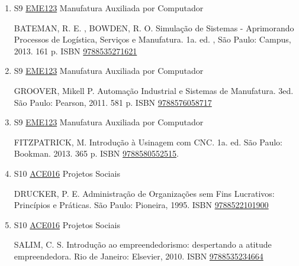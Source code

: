 \documentclass[12pt,a4paper]{book}
\begin{document}
\begin{enumerate}
 
 
 \item S9 \hyperref[PUD:EME123]{EME123} Manufatura Auxiliada por Computador

 BATEMAN, R. E. , BOWDEN, R. O.  Simulação de Sistemas - Aprimorando Processos de Logística, Serviços e Manufatura.  1a. ed. , São Paulo: Campus, 2013.  161 p.  ISBN \href{http://www.bn.br/site/pages/servicosProfissionais/agenciaISBN/isbnBusca/FbnBuscaISBNCatalogo.asp?pField=ISBN&pIntPagina=1&pISBN=35271621&nidbISBN=true&hidbISBN=true}{9788535271621}

 
 
 \item S9 \hyperref[PUD:EME123]{EME123} Manufatura Auxiliada por Computador

 GROOVER, Mikell P.  Automação Industrial e Sistemas de Manufatura.  3ed.  São Paulo: Pearson, 2011.  581 p.  ISBN \href{http://www.bn.br/site/pages/servicosProfissionais/agenciaISBN/isbnBusca/FbnBuscaISBNCatalogo.asp?pField=ISBN&pIntPagina=1&pISBN=76058717&nidbISBN=true&hidbISBN=true}{9788576058717}

 
 
 \item S9 \hyperref[PUD:EME123]{EME123} Manufatura Auxiliada por Computador

 FITZPATRICK, M.  Introdução à Usinagem com CNC.  1a.  ed.  São Paulo: Bookman.  2013.  365 p.  ISBN \href{http://www.bn.br/site/pages/servicosProfissionais/agenciaISBN/isbnBusca/FbnBuscaISBNCatalogo.asp?pField=ISBN&pIntPagina=1&pISBN=80552515&nidbISBN=true&hidbISBN=true}{9788580552515}.
 \item S10 \hyperref[PUD:ACE016]{ACE016} Projetos Sociais

  DRUCKER, P.  E.  Administração de Organizações sem Fins Lucrativos: Princípios e Práticas.  São Paulo: Pioneira, 1995.  ISBN \href{http://www.bn.br/site/pages/servicosProfissionais/agenciaISBN/isbnBusca/FbnBuscaISBNCatalogo.asp?pField=ISBN&pIntPagina=1&pISBN=22101900&nidbISBN=true&hidbISBN=true}{9788522101900}
 
 
 \item S10 \hyperref[PUD:ACE016]{ACE016} Projetos Sociais

  SALIM, C.  S.  Introdução ao empreendedorismo: despertando a atitude empreendedora.  Rio de Janeiro: Elsevier, 2010.  ISBN \href{http://www.bn.br/site/pages/servicosProfissionais/agenciaISBN/isbnBusca/FbnBuscaISBNCatalogo.asp?pField=ISBN&pIntPagina=1&pISBN=35234664&nidbISBN=true&hidbISBN=true}{9788535234664}
 

\end{enumerate}
\end{document}
